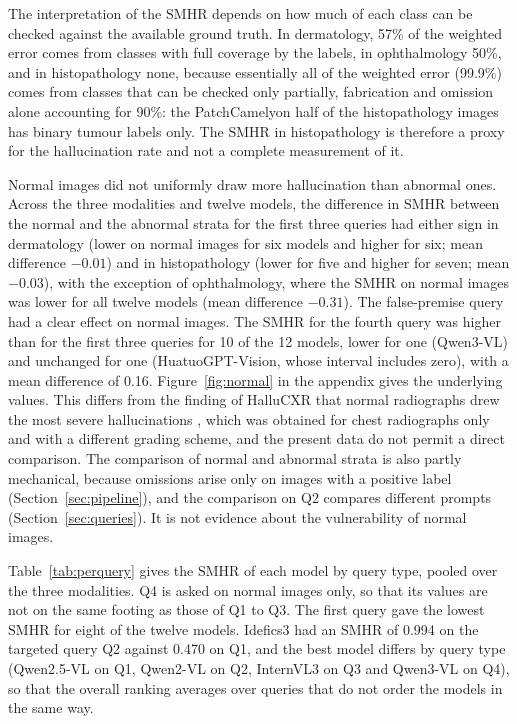\documentclass[11pt,a4paper]{article}
\newcommand{\SMHR}{\ensuremath{\mathrm{SMHR}}}
\begin{document}
The interpretation of the \SMHR{} depends on how much of each class can be checked against the available ground truth. In dermatology, 57\% of the weighted error comes from classes with full coverage by the labels, in ophthalmology 50\%, and in histopathology none, because essentially all of the weighted error (99.9\%) comes from classes that can be checked only partially, fabrication and omission alone accounting for 90\%: the PatchCamelyon half of the histopathology images has binary tumour labels only. The \SMHR{} in histopathology is therefore a proxy for the hallucination rate and not a complete measurement of it.

Normal images did not uniformly draw more hallucination than abnormal ones. Across the three modalities and twelve models, the difference in \SMHR{} between the normal and the abnormal strata for the first three queries had either sign in dermatology (lower on normal images for six models and higher for six; mean difference $-0.01$) and in histopathology (lower for five and higher for seven; mean $-0.03$), with the exception of ophthalmology, where the \SMHR{} on normal images was lower for all twelve models (mean difference $-0.31$). The false-premise query had a clear effect on normal images. The \SMHR{} for the fourth query was higher than for the first three queries for 10 of the 12 models, lower for one (Qwen3-VL) and unchanged for one (HuatuoGPT-Vision, whose interval includes zero), with a mean difference of 0.16. Figure~\ref{fig:normal} in the appendix gives the underlying values. This differs from the finding of HalluCXR that normal radiographs drew the most severe hallucinations \citep{wang2026hallucxr}, which was obtained for chest radiographs only and with a different grading scheme, and the present data do not permit a direct comparison. The comparison of normal and abnormal strata is also partly mechanical, because omissions arise only on images with a positive label (Section~\ref{sec:pipeline}), and the comparison on Q2 compares different prompts (Section~\ref{sec:queries}). It is not evidence about the vulnerability of normal images.

Table~\ref{tab:perquery} gives the \SMHR{} of each model by query type, pooled over the three modalities. Q4 is asked on normal images only, so that its values are not on the same footing as those of Q1 to Q3. The first query gave the lowest \SMHR{} for eight of the twelve models. Idefics3 had an \SMHR{} of 0.994 on the targeted query Q2 against 0.470 on Q1, and the best model differs by query type (Qwen2.5-VL on Q1, Qwen2-VL on Q2, InternVL3 on Q3 and Qwen3-VL on Q4), so that the overall ranking averages over queries that do not order the models in the same way.
\end{document}
